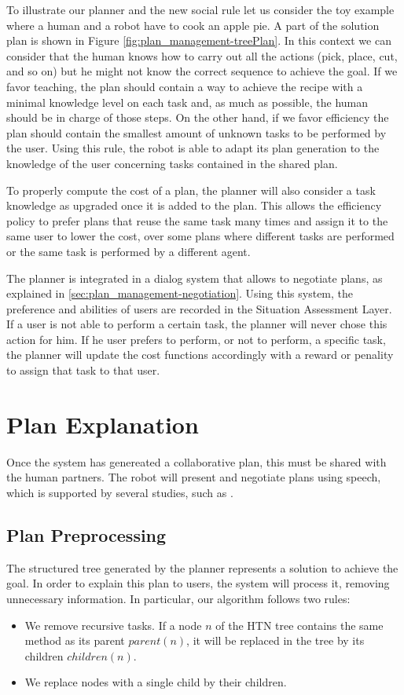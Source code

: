 To illustrate our planner and the new social rule let us consider the toy example where a human and a robot have to cook an apple pie. A part of the solution plan is shown in Figure \ref{fig:plan_management-treePlan}. In this context we can consider that the human knows how to carry out all the actions (pick, place, cut, and so on) but he might not know the correct sequence to achieve the goal. If we favor teaching, the plan should contain a way to achieve the recipe with a minimal knowledge level on each task and, as much as possible, the human should be in charge of those steps. On the other hand, if we favor efficiency the plan should contain the smallest amount of unknown tasks to be performed by the user.
Using this rule, the robot is able to adapt its plan generation to the knowledge of the user concerning tasks contained in the shared plan.

To properly compute the cost of a plan, the planner will also consider a task knowledge as upgraded once it is added to the plan. This allows the efficiency policy to prefer plans that reuse the same task many times and assign it to the same user to lower the cost, over some plans where different tasks are performed or the same task is performed by a different agent.

The planner is integrated in a dialog system that allows to negotiate plans, as explained in \ref{sec:plan_management-negotiation}. Using this system, the preference and abilities of users are recorded in the Situation Assessment Layer. 
If a user is not able to perform a certain task, the planner will never chose this action for him. If he user prefers to perform, or not to perform, a specific task, the planner will update the cost functions accordingly with a reward or penality to assign that task to that user.

\section{Plan Explanation}
\label{sec:plan_management-plan_explanation}
Once the system has genereated a collaborative plan, this must be shared with the human partners. The robot will present and negotiate plans using speech, which is supported by several studies, such as \cite{Lalle2013,tomasello2005}.

\subsection{Plan Preprocessing}
The structured tree generated by the planner represents a solution to achieve the goal. In order to explain this plan to users, the system will process it, removing unnecessary information. In particular, our algorithm follows two rules:
\begin{itemize}
	\item  We remove recursive tasks. If a node $n$ of the HTN tree contains the same method as its parent $parent(n)$, it will be replaced in the tree by its children $children(n)$. 
	\item We replace nodes with a single child by their children.
\end{itemize}

